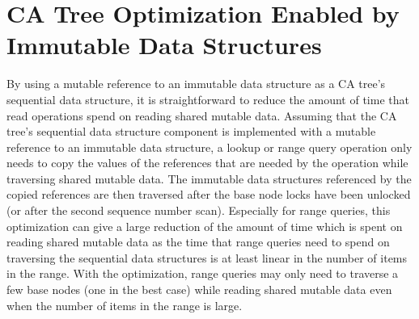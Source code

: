 \documentclass[a4paper,UKenglish]{oasics}
\begin{document}
\section{CA Tree Optimization Enabled by Immutable Data Structures\label{immopt}}
By using a mutable reference to an immutable data structure as a CA tree's sequential data structure,
it is straightforward to reduce the amount of time that read operations spend on reading shared mutable data. %
Assuming that the CA tree's sequential data structure component is implemented with a mutable reference to an immutable data structure,
a lookup or range query operation only needs to copy the values of the references that are needed by the operation while traversing shared mutable data. %
The immutable data structures referenced by the copied references are then traversed after the base node locks have been unlocked (or after the second sequence number scan).
Especially for range queries, this optimization can give a large reduction of the amount of time which is spent on reading shared mutable data as the time that range queries need to spend on traversing the sequential data structures is at least linear in the number of items in the range.
With the optimization, range queries may only need to traverse a few base nodes (one in the best case) while reading shared mutable data even when the number of items in the range is large. 
\end{document}
